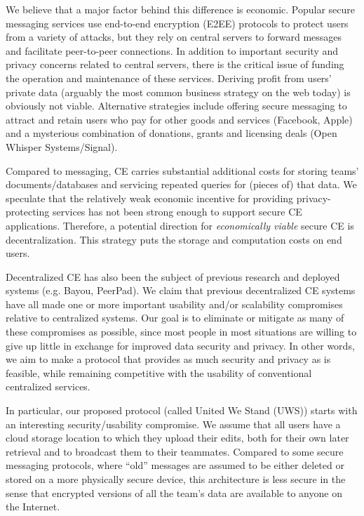 \documentclass{article}
\begin{document}
We believe that a major factor behind this difference is economic.
Popular secure messaging services use end-to-end encryption (E2EE) protocols to protect users from a variety of attacks, but they rely on central servers to forward messages and facilitate peer-to-peer connections.
In addition to important security and privacy concerns related to central servers, there is the critical issue of funding the operation and maintenance of these services.
Deriving profit from users' private data (arguably the most common business strategy on the web today) is obviously not viable.
Alternative strategies include offering secure messaging to attract and retain users who pay for other goods and services (Facebook, Apple) and a mysterious combination of donations, grants and licensing deals (Open Whisper Systems/Signal).

Compared to messaging, CE carries substantial additional costs for storing teams' documents{\slash}databases and servicing repeated queries for (pieces of) that data.
We speculate that the relatively weak economic incentive for providing privacy-protecting services has not been strong enough to support secure CE applications.
Therefore, a potential direction for \emph{economically viable} secure CE is decentralization.
This strategy puts the storage and computation costs on end users.\footnotemark{}


Decentralized CE has also been the subject of previous research and deployed systems (e.g. Bayou\cite{TODO}, PeerPad\cite{TODO}).
We claim that previous decentralized CE systems have all made one or more important usability and/or scalability compromises relative to centralized systems.
Our goal is to eliminate or mitigate as many of these compromises as possible, since most people in most situations are willing to give up little in exchange for improved data security and privacy.
In other words, we aim to make a protocol that provides as much security and privacy as is feasible, while remaining competitive with the usability of conventional centralized services.

In particular, our proposed protocol (called United We Stand (UWS)) starts with an interesting security{\slash}usability compromise.
We assume that all users have a cloud storage location to which they upload their edits, both for their own later retrieval and to broadcast them to their teammates.
Compared to some secure messaging protocols, where ``old'' messages are assumed to be either deleted or stored on a more physically secure device, this architecture is less secure in the sense that encrypted versions of all the team's data are available to anyone on the Internet.
\end{document}
